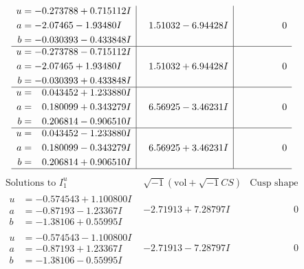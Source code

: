 \documentclass[1p]{elsarticle_modified}
\theoremstyle{definition}
\newcommand{\I}{\sqrt{-1}}
\begin{document}
$$\begin{array}{c|c|c}
\begin{aligned}
u &= -0.273788 + 0.715112 I \\
a &= -2.07465 - 1.93480 I \\
b &= -0.030393 - 0.433848 I\end{aligned}
 & \phantom{-}1.51032 - 6.94428 I & \phantom{-0.000000 } 0 \\ \hline\begin{aligned}
u &= -0.273788 - 0.715112 I \\
a &= -2.07465 + 1.93480 I \\
b &= -0.030393 + 0.433848 I\end{aligned}
 & \phantom{-}1.51032 + 6.94428 I & \phantom{-0.000000 } 0 \\ \hline\begin{aligned}
u &= \phantom{-}0.043452 + 1.233880 I \\
a &= \phantom{-}0.180099 + 0.343279 I \\
b &= \phantom{-}0.206814 - 0.906510 I\end{aligned}
 & \phantom{-}6.56925 - 3.46231 I & \phantom{-0.000000 } 0 \\ \hline\begin{aligned}
u &= \phantom{-}0.043452 - 1.233880 I \\
a &= \phantom{-}0.180099 - 0.343279 I \\
b &= \phantom{-}0.206814 + 0.906510 I\end{aligned}
 & \phantom{-}6.56925 + 3.46231 I & \phantom{-0.000000 } 0\\
 \hline 
 \end{array}$$\newpage$$\begin{array}{c|c|c}  
\text{Solutions to }I^u_{1}& \I (\text{vol} + \sqrt{-1}CS) & \text{Cusp shape}\\
 \hline 
\begin{aligned}
u &= -0.574543 + 1.100800 I \\
a &= -0.87193 - 1.23367 I \\
b &= -1.38106 + 0.55995 I\end{aligned}
 & -2.71913 + 7.28797 I & \phantom{-0.000000 } 0 \\ \hline\begin{aligned}
u &= -0.574543 - 1.100800 I \\
a &= -0.87193 + 1.23367 I \\
b &= -1.38106 - 0.55995 I\end{aligned}
 & -2.71913 - 7.28797 I & \phantom{-0.000000 } 0 \\ \hline\begin{aligned}

\end{aligned}
\end{array}$$
\end{document}
